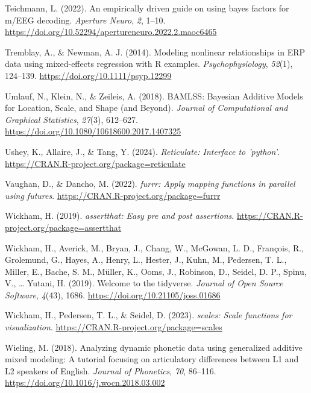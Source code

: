 \documentclass[
  man,
  floatsintext,
  longtable,
  a4paper,
  nolmodern,
  notxfonts,
  notimes,
  colorlinks=true,linkcolor=blue,citecolor=blue,urlcolor=blue]{apa7}
\newlength{\cslhangindent}
\newenvironment{CSLReferences}[2] %
 {\begin{list}{}{%
  \setlength{\itemindent}{0pt}
  \setlength{\leftmargin}{0pt}
  \setlength{\parsep}{0pt}
  \ifodd #1
   \setlength{\leftmargin}{\cslhangindent}
   \setlength{\itemindent}{-1\cslhangindent}
  \fi
  \setlength{\itemsep}{#2\baselineskip}}}
 {\end{list}}
\begin{document}
\begin{CSLReferences}{1}{0}
Teichmann, L. (2022). An empirically driven guide on using bayes factors
for m/EEG decoding. \emph{Aperture Neuro}, \emph{2}, 1--10.
\url{https://doi.org/10.52294/apertureneuro.2022.2.maoc6465}

Tremblay, A., \& Newman, A. J. (2014). Modeling nonlinear relationships
in ERP data using mixed{-}effects regression with R examples.
\emph{Psychophysiology}, \emph{52}(1), 124--139.
\url{https://doi.org/10.1111/psyp.12299}

Umlauf, N., Klein, N., \& Zeileis, A. (2018). BAMLSS: Bayesian Additive
Models for Location, Scale, and Shape (and Beyond). \emph{Journal of
Computational and Graphical Statistics}, \emph{27}(3), 612--627.
\url{https://doi.org/10.1080/10618600.2017.1407325}

Ushey, K., Allaire, J., \& Tang, Y. (2024). \emph{Reticulate: Interface
to 'python'}. \url{https://CRAN.R-project.org/package=reticulate}

Vaughan, D., \& Dancho, M. (2022). \emph{{furrr}: Apply mapping
functions in parallel using futures}.
\url{https://CRAN.R-project.org/package=furrr}

Wickham, H. (2019). \emph{{assertthat}: Easy pre and post assertions}.
\url{https://CRAN.R-project.org/package=assertthat}

Wickham, H., Averick, M., Bryan, J., Chang, W., McGowan, L. D.,
François, R., Grolemund, G., Hayes, A., Henry, L., Hester, J., Kuhn, M.,
Pedersen, T. L., Miller, E., Bache, S. M., Müller, K., Ooms, J.,
Robinson, D., Seidel, D. P., Spinu, V., \ldots{} Yutani, H. (2019).
Welcome to the {tidyverse}. \emph{Journal of Open Source Software},
\emph{4}(43), 1686. \url{https://doi.org/10.21105/joss.01686}

Wickham, H., Pedersen, T. L., \& Seidel, D. (2023). \emph{{scales}:
Scale functions for visualization}.
\url{https://CRAN.R-project.org/package=scales}

Wieling, M. (2018). Analyzing dynamic phonetic data using generalized
additive mixed modeling: A tutorial focusing on articulatory differences
between L1 and L2 speakers of English. \emph{Journal of Phonetics},
\emph{70}, 86--116. \url{https://doi.org/10.1016/j.wocn.2018.03.002}


\end{CSLReferences}
\end{document}
